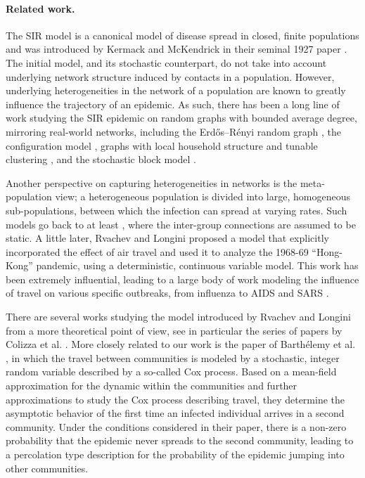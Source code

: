 \documentclass[11pt]{article}
\begin{document}
\paragraph{Related work.}
The SIR model is a canonical model of disease spread in closed, finite populations and was introduced by Kermack and McKendrick in their seminal 1927 paper \cite{kermack1927contribution}. The initial model, and its stochastic counterpart, do not take into account underlying network structure induced by contacts in a population. However, underlying heterogeneities in the network of a population are known to greatly influence the trajectory of an epidemic. As such, there has been a long line of work studying the SIR epidemic on random graphs with bounded average degree, mirroring real-world networks, including the Erd\H{o}s--R\'enyi random graph \cite{neal2003sir}, the configuration model \cite{Bohman2012, barbour2013approximating, Decreusefond2012, janson14:lln-sir}, graphs with local household structure and tunable clustering \cite{Ball2010, house2012modelling, Britton2008}, and the stochastic block model \cite{borgs2024lawlargenumberssir}. 

Another perspective on capturing heterogeneities in networks is the meta-population view; a heterogeneous population is divided into large, homogeneous sub-populations, between which the infection can spread at varying rates. Such models go back to at least 
\cite{hethcote1978immunization}, where the inter-group connections are assumed to be static.  A little later, Rvachev and Longini  \cite{rvachev1985mathematical} proposed a model that explicitly incorporated the effect of air travel and used it to analyze the 1968-69 ``Hong-Kong'' pandemic, using a deterministic, continuous variable model.  This work has been extremely influential, leading to a large body of  work modeling the influence of travel on various specific outbreaks, from influenza \cite{longini88,grais03,grais04} to AIDS \cite{flahault92} and SARS \cite{hufnagel04}.

There are several works studying the model introduced by Rvachev and Longini from a more theoretical point of view, see in particular the series of papers by Colizza et al. \cite{colizza2007modeling,colizza2007invasion,colizza2007reaction,colizza2008epidemic}. More closely related to our work is the paper of Barth\'elemy et al. \cite{barthelemy2010fluctuation}, in which the travel between communities is modeled by a stochastic, integer random variable described by a so-called Cox process. Based on a mean-field approximation for the dynamic within the communities and further approximations to study the Cox process describing travel, 
they determine the asymptotic behavior of the first time an infected individual arrives in a second community. Under the conditions considered in their paper, there is a non-zero probability that the epidemic never spreads to the second community, leading to a percolation type description for the probability of the epidemic jumping into other communities.
\end{document}
